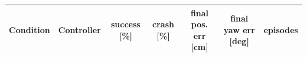 \begin{tabular}{llccccc}\toprule
Condition & Controller & success [\%] & crash [\%] & final pos. err [cm] & final yaw err [deg] & episodes\\\midrule

\bottomrule\end{tabular}

